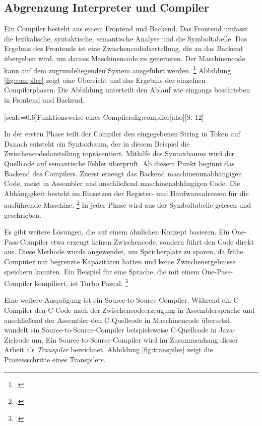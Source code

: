 \subsection{Abgrenzung Interpreter und Compiler}
  
Ein Compiler besteht aus einem Frontend und Backend. Das Frontend umfasst die lexikalische, syntaktische, semantische Analyse und die Symboltabelle.
Das Ergebnis des Frontends ist eine Zwischencodedarstellung, die an das Backend übergeben wird, um daraus Maschinencode zu generieren. Der Maschinencode kann auf dem zugrundeliegenden System ausgeführt werden. \footcite[Vgl. ][S.106ff. ]{aho}
Abbildung \ref{fig:compiler} zeigt eine Übersicht und das Ergebnis der einzelnen Compilerphasen. Die Abbildung unterteilt den Ablauf wie eingangs beschrieben in Frontend und Backend.

[scale=0.6]{Funktionsweise eines Compilers}{fig:compiler}[aho][S. 12]

In der ersten Phase teilt der Compiler den eingegebenen String in Token auf. Danach entsteht ein Syntaxbaum, der in diesem Beispiel die Zwischencodedarstellung repräsentiert. Mithilfe des Syntaxbaums wird der Quellcode auf semantische Fehler überprüft. Ab diesem Punkt beginnt das Backend des Compilers. Zuerst erzeugt das Backend maschinenunabhängigen Code, meist in Assembler und anschließend maschinenabhängigen Code. Die Abhängigkeit besteht im Einsetzen der Register- und Hardwareadressen für die ausführende Maschine.  \footcite[Vgl. ][S.30ff. ]{aho}
In jeder Phase wird aus der Symboltabelle gelesen und geschrieben.

Es gibt weitere Lösungen, die auf einem ähnlichen Konzept basieren.
Ein One-Pass-Compiler etwa erzeugt keinen Zwischencode, sondern führt den Code direkt aus. Diese Methode wurde angewendet, um Speicherplatz zu sparen, da frühe Computer nur begrenzte Kapazitäten hatten und keine Zwischenergebnisse speichern konnten. Ein Beispiel für eine Sprache, die mit einem One-Pass-Compiler kompiliert, ist Turbo Pascal. \footcite[Vgl. ][]{onepass}

Eine weitere Ausprägung ist ein Source-to-Source Compiler. Während ein C-Compiler den C-Code nach der Zwischencodeerzeugung in Assemblersprache und anschließend der Assembler den C-Quellcode in Maschinencode übersetzt, wandelt ein Source-to-Source-Compiler beispielsweise C-Quellcode in Java-Zielcode um. 
Ein Source-to-Source-Compiler wird im Zusammenhang dieser Arbeit als \emph{Transpiler} bezeichnet. Abbildung \ref{fig:transpiler} zeigt die Prozessschritte eines Transpilers.

